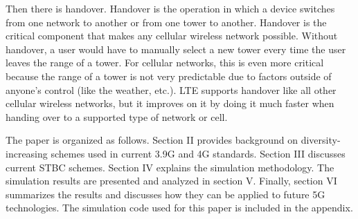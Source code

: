 Then there is handover. Handover is the operation in which a device switches from one network to another or from one tower to another. Handover is the critical component that makes any cellular wireless network possible. Without handover, a user would have to manually select a new tower every time the user leaves the range of a tower. For cellular networks, this is even more critical because the range of a tower is not very predictable due to factors outside of anyone’s control (like the weather, etc.). LTE supports handover like all other cellular wireless networks, but it improves on it by doing it much faster when handing over to a supported type of network or cell.

The paper is organized as follows. Section II provides background on diversity-increasing schemes used in current 3.9G and 4G standards. Section III discusses current STBC schemes. Section IV explains the simulation methodology. The simulation results are presented and analyzed in section V. Finally, section VI summarizes the results and discusses how they can be applied to future 5G technologies. The simulation code used for this paper is included in the appendix.
